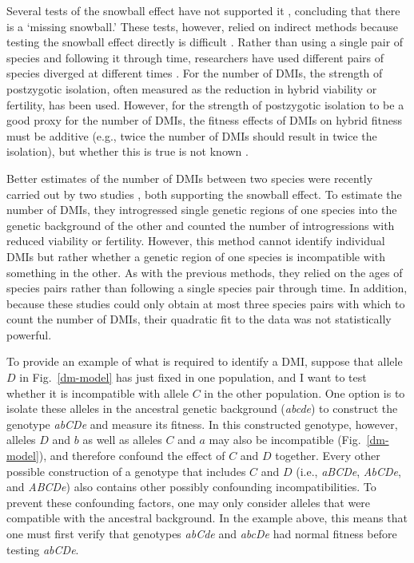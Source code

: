 \begin{doublespace}
Several tests of the snowball effect have not supported it
\citep{lij03,men04,gou10}, concluding that there is a `missing snowball.'
%
These tests, however, relied on indirect methods
because testing the snowball effect directly is difficult \citep{men04}.
%
Rather than using a single pair of species and following it through time,
researchers have used different pairs of species diverged at different times
\citep{mal08,sco08}.
%
For the number of DMIs, the strength of postzygotic isolation,
often measured as the reduction in hybrid viability or fertility, has been used.
%
However, for the strength of postzygotic isolation to be a good proxy
for the number of DMIs,
the fitness effects of DMIs on hybrid fitness must be additive
\citep{men04,bol05}
(e.g., twice the number of DMIs should result in twice the isolation),
but whether this is true is not known \citep{bol05,pre10}.




Better estimates of the number of DMIs between two species
were recently carried out by two studies \citep{mat10,moy10},
both supporting the snowball effect.
%
To estimate the number of DMIs, they introgressed single genetic regions
of one species into the genetic background of the other and
counted the number of introgressions with reduced viability or fertility.
%
However, this method cannot identify individual DMIs
but rather whether a genetic region of one species
is incompatible with something in the other.
%
As with the previous methods, they relied on the ages of species pairs
rather than following a single species pair through time.
%
In addition, because these studies could only obtain
at most three species pairs with which to count the number of DMIs,
their quadratic fit to the data was not statistically powerful.




To provide an example of what is required to identify a DMI,
suppose that allele $D$ in Fig.~\ref{dm-model} has just fixed
in one population, and I want to test whether it is incompatible
with allele $C$ in the other population.
%
One option is to isolate these alleles in the ancestral genetic background
(\emph{abcde}) to construct the genotype \emph{abCDe} and measure its fitness.
%
In this constructed genotype, however,
alleles $D$ and $b$ as well as alleles $C$ and $a$
may also be incompatible (Fig.~\ref{dm-model}),
and therefore confound the effect of $C$ and $D$ together.
%
Every other possible construction of a genotype that includes $C$ and $D$
(i.e., \emph{aBCDe}, \emph{AbCDe}, and \emph{ABCDe})
also contains other possibly confounding incompatibilities.
%
To prevent these confounding factors, one may only consider
alleles that were compatible with the ancestral background.
%
In the example above, this means that one must first verify that genotypes
\emph{abCde} and \emph{abcDe} had normal fitness before testing \emph{abCDe}.



\end{doublespace}
